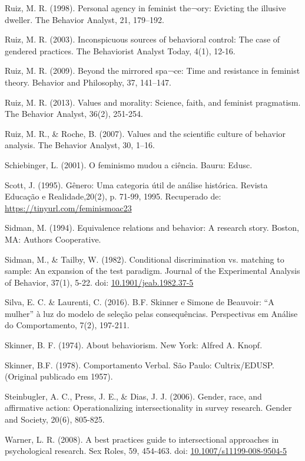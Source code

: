 \hangindent=25pt
\noindent Ruiz, M. R. (1998). Personal agency in feminist the¬ory: Evicting the illusive dweller. The Behavior Analyst, 21, 179–192.

\hangindent=25pt
\noindent Ruiz, M. R. (2003). Inconspicuous sources of behavioral control: The case of gendered practices. The Behaviorist Analyst Today, 4(1), 12-16. 

\hangindent=25pt
\noindent Ruiz, M. R. (2009). Beyond the mirrored spa¬ce: Time and resistance in feminist theory. Behavior and Philosophy, 37, 141–147.

\hangindent=25pt
\noindent Ruiz, M. R. (2013). Values and morality: Science, faith, and feminist pragmatism. The Behavior Analyst, 36(2), 251-254. 

\hangindent=25pt
\noindent Ruiz, M. R., \& Roche, B. (2007). Values and the scientific culture of behavior analysis. The Behavior Analyst, 30, 1–16.

\hangindent=25pt
\noindent Schiebinger, L. (2001). O feminismo mudou a ciência. Bauru: Edusc.

\hangindent=25pt
\noindent Scott, J. (1995). Gênero: Uma categoria útil de análise histórica. Revista Educação e Realidade,20(2), p. 71-99, 1995. Recuperado de: \url{https://tinyurl.com/feminismoac23}

\hangindent=25pt
\noindent Sidman, M. (1994). Equivalence relations and behavior: A research story. Boston, MA: Authors Cooperative.

\hangindent=25pt
\noindent Sidman, M., \& Tailby, W. (1982). Conditional discrimination vs. matching to sample: An expansion of the test paradigm. Journal of the Experimental Analysis of Behavior, 37(1), 5-22. doi: \url{10.1901/jeab.1982.37-5}

\hangindent=25pt
\noindent Silva, E. C. \& Laurenti, C. (2016). B.F. Skinner e Simone de Beauvoir: “A mulher” à luz do modelo de seleção pelas consequências. Perspectivas em Análise do Comportamento, 7(2), 197-211.

\hangindent=25pt
\noindent Skinner, B. F. (1974). About behaviorism. New York: Alfred A. Knopf.

\hangindent=25pt
\noindent Skinner, B.F. (1978). Comportamento Verbal. São Paulo: Cultrix/EDUSP. (Original publicado em 1957).

\hangindent=25pt
\noindent Steinbugler, A. C., Press, J. E., \& Dias, J. J. (2006). Gender, race, and affirmative action: Operationalizing intersectionality in survey research. Gender and Society, 20(6), 805-825.

\hangindent=25pt
\noindent Warner, L. R. (2008). A best practices guide to intersectional approaches in psychological research. Sex Roles, 59, 454-463. doi: \url{10.1007/s11199-008-9504-5}

